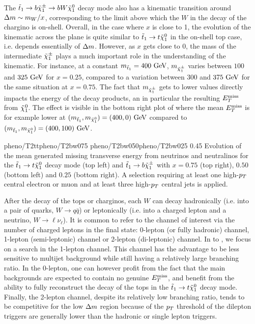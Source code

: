     The $\tilde{t}_1 \rightarrow b \tilde{\chi}_1^\pm \rightarrow b W \tilde{\chi}_1^0$ decay mode also
    has a kinematic transition around $\Delta m \sim m_W/x$, corresponding to the limit
    above which the $W$ in the decay of the chargino is on-shell. Overall, in the
    case where $x$ is close to 1, the evolution of the kinematic across the plane
    is quite similar to $\tilde{t}_1 \rightarrow t \tilde{\chi}_1^0$ in the on-shell top case,
    i.e. depends essentially of $\Delta m$.
    However, as $x$ gets close to 0, the mass of the intermediate $\tilde{\chi}_1^\pm$ plays
    a much important role in the understanding of the kinematic. For instance, at a
    constant $m_{\tilde{t}_1} = 400~\text{GeV}$, $m_{\tilde{\chi}_1^\pm}$ varies between $100$
    and $325~\text{GeV}$ for $x = 0.25$, compared to a variation between $300$ and $375~\text{GeV}$
    for the same situation at $x = 0.75$. The fact that $m_{\tilde{\chi}_1^\pm}$ gets to
    lower values directly impacts the energy of the decay products, an in particular
    the resulting $E_T^\text{miss}$ from $\tilde{\chi}_1^0$. The effect is visible in the bottom right
    plot of  where the mean $E_T^\text{miss}$ is for example lower at
    $(m_{\tilde{t}_1},m_{\tilde{\chi}_1^0}) = (400,0) ~\text{GeV}$ compared to $(m_{\tilde{t}_1},
    m_{\tilde{\chi}_1^0}) = (400,100) ~\text{GeV}$.

                 {pheno/T2tt}{pheno/T2bw075}
                 {pheno/T2bw050}{pheno/T2bw025}
                 {0.45}
                 {Evolution of the mean generated missing transverse energy from neutrinos
                 and neutralinos for the $\tilde{t}_1 \rightarrow t \tilde{\chi}_1^0$
                 decay mode (top left) and $\tilde{t}_1 \rightarrow b \tilde{\chi}_1^\pm$ with
                 $x = 0.75$ (top right), $0.50$ (bottom left) and $0.25$ (bottom right).
                 A selection requiring at least one high-$p_T$ central
                 electron or muon and at least three high-$p_T$ central jets is applied.}

    After the decay of the tops or charginos, each $W$ can decay hadronically (i.e. into
    a pair of quarks, $W \rightarrow q\bar{q}$) or leptonically (i.e. into a charged
    lepton and a neutrino, $W \rightarrow \ell \nu_{\ell}$). It is common to refer to
    the channel of interest via the number of charged leptons in the final state: 0-lepton
    (or fully hadronic) channel, 1-lepton (semi-leptonic) channel or 2-lepton (di-leptonic)
    channel. In  to , we focus on
    a search in the 1-lepton channel. This channel has the advantage to be less sensitive
    to multijet background while still having a relatively large branching ratio. In the
    0-lepton, one can however profit from the fact that the main backgrounds are expected
    to contain no genuine $E_T^\text{miss}$, and benefit from the ability to fully reconstruct the
    decay of the tops in the $\tilde{t}_1 \rightarrow t \tilde{\chi}_1^0$ decay mode. Finally, the
    2-lepton channel, despite its relatively low branching ratio, tends to be competitive
    for the low $\Delta m$ region because of the $p_T$ threshold of the dilepton triggers are
    generally lower than the hadronic or single lepton triggers.

